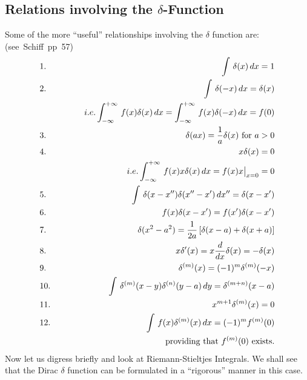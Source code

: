 \subsection{Relations involving the $\delta$-Function}
Some of the more ``useful'' relationships involving the $\delta$ function are: \hbox{(see Schiff pp 57)}
\begin{eqnarray*}
&1.~& \int\, \delta(x)\, dx  = 1\\
&2.~& \int\, \delta(-x)\, dx = \delta(x) \\
&\null&~~~~~~~~~i.e. \int_{-\infty}^{+\infty}\, f(x)\delta(x) \, dx = \int_{-\infty}^{+\infty}\, f(x)\delta(-x) \, dx = f(0)\\
&3.~& \delta(ax) = {1\over a} \delta(x) \mbox{ for } a> 0\\
&4.~& x\delta(x) = 0\\
&\null&~~~~~~~~~ i.e. \int_{-\infty}^{+\infty}\, f(x) x \delta(x) \, dx = f(x) x \big|_{x=0} = 0 \\
&5.~& \int\,\delta(x-x'')\delta(x''- x')\, dx'' = \delta(x-x')\\
&6.~& f(x)\delta(x-x') = f(x')\delta(x-x')\\
&7.~& \delta(x^2 - a^2) = {1\over2a} \left[\delta(x-a) + \delta(x+a)\right]\\
&8.~& x\delta'(x) = x{d\over dx}\delta(x) = -\delta(x)\\
&9.~& \delta^{(m)}(x) = (-1)^m \delta^{(m)}(-x)\\
&10.& \int\, \delta^{(m)}(x-y) \delta^{(n)}(y-a)\, dy = \delta^{(m+n)}(x-a)\\
&11.& x^{m+1}\delta^{(m)}(x) = 0\\
&12.& \int\, f(x) \delta^{(m)}(x)\, dx = (-1)^m f^{(m)}(0)\\
&\null&~~~~~~~~~~\mbox{ providing that } f^{(m)}(0) \mbox{ exists}.
\end{eqnarray*}
Now let us digress briefly and look at Riemann-Stieltjes Integrals.
We shall see that the Dirac $\delta$ function can be formulated in a ``rigorous'' manner in this case. 

